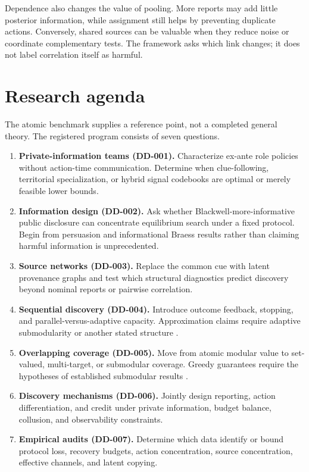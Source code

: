 \documentclass[11pt]{article}
\theoremstyle{remark}
\begin{document}
Dependence also changes the value of pooling. More reports may add little posterior information, while assignment still helps by preventing duplicate actions. Conversely, shared sources can be valuable when they reduce noise or coordinate complementary tests. The framework asks which link changes; it does not label correlation itself as harmful.

\section{Research agenda}
The atomic benchmark supplies a reference point, not a completed general theory. The registered program consists of seven questions.

\begin{enumerate}
\item \textbf{Private-information teams (DD-001).} Characterize ex-ante role policies without action-time communication. Determine when clue-following, territorial specialization, or hybrid signal codebooks are optimal or merely feasible lower bounds.
\item \textbf{Information design (DD-002).} Ask whether Blackwell-more-informative public disclosure can concentrate equilibrium search under a fixed protocol. Begin from persuasion and informational Braess results rather than claiming harmful information is unprecedented.
\item \textbf{Source networks (DD-003).} Replace the common cue with latent provenance graphs and test which structural diagnostics predict discovery beyond nominal reports or pairwise correlation.
\item \textbf{Sequential discovery (DD-004).} Introduce outcome feedback, stopping, and parallel-versus-adaptive capacity. Approximation claims require adaptive submodularity or another stated structure \citep{GolovinKrause2011}.
\item \textbf{Overlapping coverage (DD-005).} Move from atomic modular value to set-valued, multi-target, or submodular coverage. Greedy guarantees require the hypotheses of established submodular results \citep{NemhauserEtAl1978}.
\item \textbf{Discovery mechanisms (DD-006).} Jointly design reporting, action differentiation, and credit under private information, budget balance, collusion, and observability constraints.
\item \textbf{Empirical audits (DD-007).} Determine which data identify or bound protocol loss, recovery budgets, action concentration, source concentration, effective channels, and latent copying.
\end{enumerate}
\end{document}
